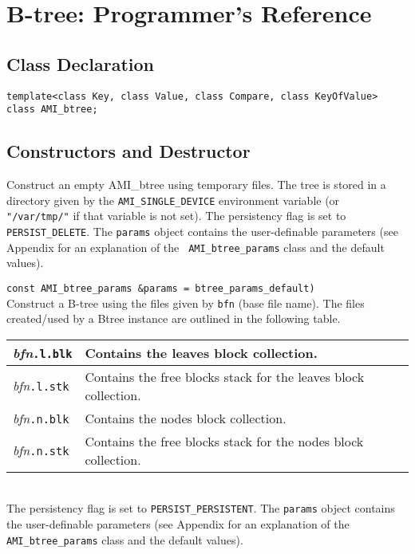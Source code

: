 \chapter{B-tree: Programmer's Reference}

\section{Class Declaration}
\btabb

   \> {\tt template<class Key, class Value, class Compare, class
   KeyOfValue> class AMI\_btree;}

\etabb

\section{Constructors and Destructor}

\btabb

   {Construct an empty AMI\_btree using temporary files. The tree is stored in a
   directory given by the {\tt AMI\_SINGLE\_DEVICE} environment variable (or {\tt
   "/var/tmp/"} if that variable is not set). The persistency flag is set to
   {\tt PERSIST\_DELETE}. The {\tt params} object contains the
   user-definable parameters (see Appendix for an explanation of the {\tt
   AMI\_btree\_params} class and the default values).}

    { {\tt\qquad\qquad\qquad\qquad const
   AMI\_btree\_params \&params = btree\_params\_default)}\\ Construct a B-tree
   using the files given by {\tt bfn} (base file name).  The files
   created/used by a Btree instance are outlined in the following
   table.\\[1mm] \begin{tabular}{|l|l|} \hline {\em bfn}{\tt .l.blk} &
   Contains the leaves block collection.\\ \hline {\em bfn}{\tt .l.stk} &
   Contains the free blocks stack for the leaves block collection.\\ \hline
   {\em bfn}{\tt .n.blk} & Contains the nodes block collection.\\ \hline
   {\em bfn}{\tt .n.stk} & Contains the free blocks stack for the nodes
   block collection.\\ \hline \end{tabular}\\[2mm] The persistency flag is
   set to {\tt PERSIST\_PERSISTENT}. The {\tt params} object contains the
   user-definable parameters (see Appendix for an explanation of the {\tt
   AMI\_btree\_params} class and the default values).}

